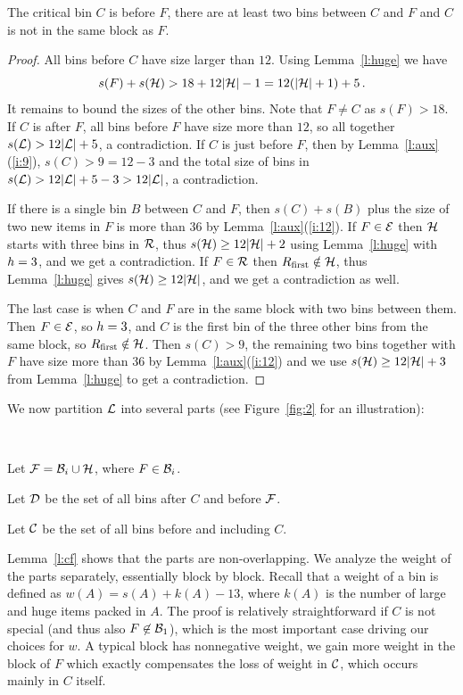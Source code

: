 \begin{lem}
\label{l:cf} 
The critical bin $C$ is before $F$, there are at least two bins
between $C$ and $F$ and $C$ is not in the same block as $F$.
\end{lem}
\begin{proof}
All bins before $C$ have size larger than $12$. Using
Lemma~\ref{l:huge} we have
$$s(F)+s({\mathcal H})>18+12|{\mathcal H}|-1=12(|{\mathcal H}|+1)+5\,.$$ 
It remains to bound the sizes of the other bins. Note that $F\neq C$ as $s(F)>18$.
If $C$ is after $F$,
all bins before $F$ have size more than $12$, so all together
$s({\mathcal L})>12|{\mathcal L}|+5$, a contradiction. If $C$ is just before $F$,
then by Lemma~\ref{l:aux}(\ref{i:9}),
$s(C)>9=12-3$ and the total size of bins in $s({\mathcal L})>
12|{\mathcal L}|+5-3>12|{\mathcal L}|$, a contradiction.

If there is a single bin $B$ between $C$ and $F$, then $s(C)+s(B)$
plus the size of two new items in $F$ is more than $36$ by
Lemma~\ref{l:aux}(\ref{i:12}). If $F\in{\mathcal E}$ then ${\mathcal H}$ starts with
three bins in ${\mathcal R}$, thus $s({\mathcal H})\geq12|{\mathcal H}|+2$ using 
Lemma~\ref{l:huge} with ${h}=3$, and we get a
contradiction. If $F\in{\mathcal R}$ then $R_{\mbox{\rm\scriptsize first}}\notin{\mathcal H}$, thus
Lemma~\ref{l:huge} gives $s({\mathcal H})\geq12|{\mathcal H}|$, and we get a
contradiction as well.

The last case is when $C$ and $F$ are in the same block with two bins
between them. Then $F\in{\mathcal E}$, so ${h}=3$, and $C$ is the first
bin of the three other 
bins from the same block, so $R_{\mbox{\rm\scriptsize first}}\notin{\mathcal H}$. Then $s(C)>9$, the
remaining two bins together with $F$ have size more than $36$ by
Lemma~\ref{l:aux}(\ref{i:12}) and we use $s({\mathcal H})\ge 12|{\mathcal H}|+3$ from
Lemma~\ref{l:huge} to get a contradiction.
\end{proof}
We now partition ${\mathcal L}$ into several parts (see Figure~\ref{fig:2} for an illustration):

\begin{dfn}~
\begin{compactitem}
\item Let ${\mathcal F}={\mathcal B}_i\cup{\mathcal H}$, where $F\in{\mathcal B}_i$.
\item Let ${\mathcal D}$ be the set of all bins after $C$ and before ${\mathcal F}$.
\item Let ${\mathcal C}$ be the set of all bins before and including $C$.
\end{compactitem}
\end{dfn}

Lemma~\ref{l:cf} shows that the
parts are non-overlapping. We analyze the weight of the parts
separately, essentially block by block.
Recall that a weight of a bin is defined as $w(A)=s(A)+k(A)-13$,
where $k(A)$ is the number of large and huge items packed in $A$.
The proof is relatively
straightforward if $C$ is not special (and thus also
$F\not\in{\mathcal B}_1$), 
which is the most important case driving our choices for $w$. 
A typical block has nonnegative weight, we gain more
weight in the block of $F$ which exactly compensates the loss of
weight in ${\mathcal C}$, which occurs mainly in $C$ itself. 

